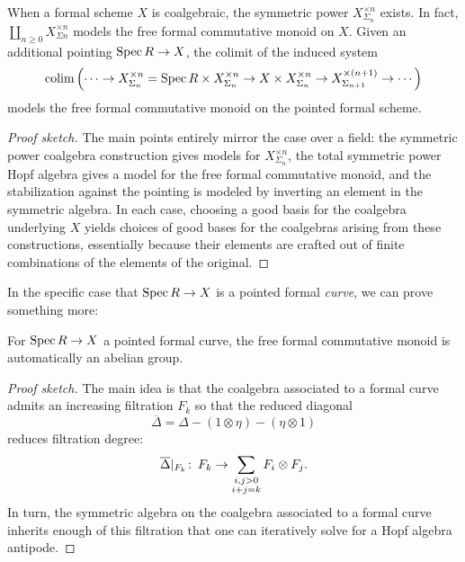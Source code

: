 \begin{corollary}\label{ProofOfFreeFormalMonoids}
When a formal scheme \(X\) is coalgebraic, the symmetric power \(X^{\times n}_{\Sigma_n}\) exists.
In fact, \(\coprod_{n \ge 0} X^{\times n}_{\Sigma n}\) models the free formal commutative monoid on \(X\).
Given an additional pointing \(\operatorname{Spec} R \to X\), the colimit of the induced system \[\operatorname*{colim} \left(\cdots \to X^{\times n}_{\Sigma_n} = \operatorname{Spec} R \times X^{\times n}_{\Sigma_n} \to X \times X^{\times n}_{\Sigma_n} \to X^{\times(n+1)}_{\Sigma_{n+1}} \to \cdots\right)\] models the free formal commutative monoid on the pointed formal scheme.
\end{corollary}
\begin{proof}[Proof sketch]
The main points entirely mirror the case over a field: the symmetric power coalgebra construction gives models for \(X^{\times n}_{\Sigma_n}\), the total symmetric power Hopf algebra gives a model for the free formal commutative monoid, and the stabilization against the pointing is modeled by inverting an element in the symmetric algebra.
In each case, choosing a good basis for the coalgebra underlying \(X\) yields choices of good bases for the coalgebras arising from these constructions, essentially because their elements are crafted out of finite combinations of the elements of the original.
\end{proof}

In the specific case that \(\operatorname{Spec} R \to X\) is a pointed formal \emph{curve}, we can prove something more:
\begin{corollary}\label{FreeFormalGroupOnACurve}
For \(\operatorname{Spec} R \to X\) a pointed formal curve, the free formal commutative monoid is automatically an abelian group.
\end{corollary}
\begin{proof}[Proof sketch]
The main idea is that the coalgebra associated to a formal curve admits an increasing filtration \(F_k\) so that the reduced diagonal \[\overline \Delta = \Delta - (1 \otimes \eta) - (\eta \otimes 1)\] reduces filtration degree: \[\overline \Delta|_{F_k}\colon\thinspace F_k \to \sum_{\substack{i,j > 0 \\ i+j=k}} F_i \otimes F_j.\]
In turn, the symmetric algebra on the coalgebra associated to a formal curve inherits enough of this filtration that one can iteratively solve for a Hopf algebra antipode.
\end{proof}

